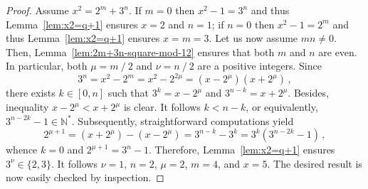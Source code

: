 \documentclass[12pt]{article}
\newcommand{\bZ}{\mathbb{Z}}
\newcommand{\bN}{\mathbb{N}} %
\newcommand{\bNast}{\bN^*}
\newcommand{\binover}{\mathbin{/}}
\theoremstyle{definition}
\begin{document}
   \begin{proof}
     Assume $x^2 = 2^m + 3^n$.
     If $m = 0$ then $x^2 - 1 = 3^n$ and thus Lemma~\ref{lem:x2=q+1} ensures $x = 2$ and $n = 1$;
     if $n = 0$ then $x^2 - 1 = 2^m$ and thus Lemma~\ref{lem:x2=q+1} ensures $x = m = 3$.
     Let us now assume $mn \ne 0$.
     Then, Lemma~\ref{lem:2m+3n-square-mod-12} ensures that both $m$ and $n$ are even.
     In particular, both $\mu = m \binover 2$ and $\nu = n \binover 2$ are a positive integers.
     Since 
     $$
     3^n = x^2 - 2^m = x^2 - 2^{2\mu} = (x - 2^\mu)(x + 2^\mu) \,, 
     $$
     there exists $k \in [0, n]$ such that $3^k = x - 2^\mu$ and $3^{n - k} = x + 2^\mu$.
     Besides, inequality $x - 2^\mu < x + 2^\mu$ is clear. 
     It follows $k < n - k$, or equivalently, $3^{n - 2 k} - 1 \in \bNast$.
     Subsequently, straightforward computations yield
     $$
     2^{\mu + 1} = (x + 2^\mu) - (x - 2^\mu) = 3^{n - k} - 3^k = 3^k \left( 3^{n - 2k} - 1 \right) \,,
     $$
     whence $k = 0$ and $2^{\mu + 1} = 3^n - 1$.
     Therefore, 
     Lemma~\ref{lem:x2=q+1} ensures $3^\nu \in \{ 2, 3 \}$.
     It follows $\nu = 1$, $n = 2$, $\mu = 2$, $m = 4$, and $x = 5$.
     The desired result is now easily checked by inspection. 
  \end{proof}
\end{document}
